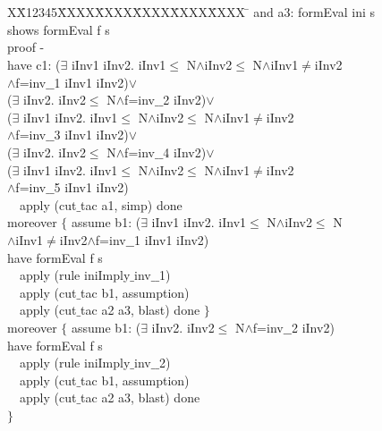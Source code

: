 \documentclass[final]{IEEEtran}
\newlength{\fminilength}
\newenvironment{fmini}[1][\linewidth]
  {\setlength{\fminilength}{#1\fboxsep-2\fboxrule}%
   \vspace{2ex}\noindent\begin{lrbox}{\fminibox}\begin{minipage}{\fminilength}%
   \mbox{ }\hfill\vspace{-2.5ex}}%
  {\end{minipage}\end{lrbox}\vspace{1ex}\hspace{0ex}%
   \framebox{\usebox{\fminibox}}}
\newenvironment{specification}
{\noindent\scriptsize
\tt\begin{fmini}\begin{tabbing}X\=X12345\=XXXX\=XXXX\=XXXX\=XXXX\=XXXX
\=\+\kill} {\end{tabbing}\normalfont\end{fmini}}
\def \twoSpaces {\ \ }
\def \iInv {iInv}
\begin{document}
{\begin{specification}
 and a3:
formEval ini s\\

 shows formEval f s\\

  proof -\\
  have c1:
($\exists$ \iInv1 \iInv2. \iInv1$\le$
N$\wedge$\iInv2$\le$
N$\wedge$\iInv1$\neq$\iInv2\\
$\wedge$f=inv$\_$$\_$1  \iInv1 \iInv2)$\vee$\\
    ($\exists$ \iInv2. \iInv2$\le$
N$\wedge$f=inv$\_$$\_$2  \iInv2)$\vee$\\
    ($\exists$ \iInv1 \iInv2. \iInv1$\le$
N$\wedge$\iInv2$\le$
N$\wedge$\iInv1$\neq$\iInv2\\
$\wedge$f=inv$\_$$\_$3  \iInv1 \iInv2)$\vee$\\
    ($\exists$ \iInv2. \iInv2$\le$
N$\wedge$f=inv$\_$$\_$4  \iInv2)$\vee$\\
    ($\exists$ \iInv1 \iInv2. \iInv1$\le$
N$\wedge$\iInv2$\le$
N$\wedge$\iInv1$\neq$\iInv2\\
$\wedge$f=inv$\_$$\_$5  \iInv1 \iInv2)\\

\twoSpaces  apply (cut$\_$tac a1, simp) done\\
    moreover $\{$
      assume b1:
($\exists$ \iInv1 \iInv2. \iInv1$\le$
N$\wedge$\iInv2$\le$
N\\
$\wedge$\iInv1$\neq$\iInv2$\wedge$f=inv$\_$$\_$1  \iInv1 \iInv2)\\

      have
formEval f s\\

\twoSpaces      apply (rule iniImply$\_$inv$\_$$\_$1)\\
\twoSpaces      apply (cut$\_$tac b1, assumption)\\
\twoSpaces      apply (cut$\_$tac a2 a3, blast) done
    $\}$\\


    moreover $\{$
      assume b1:
($\exists$ \iInv2. \iInv2$\le$
N$\wedge$f=inv$\_$$\_$2  \iInv2)\\

      have
formEval f s\\

\twoSpaces      apply (rule iniImply$\_$inv$\_$$\_$2)\\
\twoSpaces      apply (cut$\_$tac b1, assumption)\\
\twoSpaces      apply (cut$\_$tac a2 a3, blast) done\\
    $\}$\\



\end{specification}}
\end{document}
